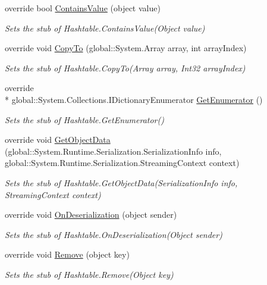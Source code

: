 \begin{DoxyCompactItemize}
override bool \hyperlink{class_system_1_1_configuration_1_1_fakes_1_1_stub_settings_context_a463a29ff1be652e69071918c94d49767}{Contains\-Value} (object value)
\begin{DoxyCompactList}\small\item\em Sets the stub of Hashtable.\-Contains\-Value(\-Object value)\end{DoxyCompactList}\item 
override void \hyperlink{class_system_1_1_configuration_1_1_fakes_1_1_stub_settings_context_a736d29f96651e18a1ee555c541705fd5}{Copy\-To} (global\-::\-System.\-Array array, int array\-Index)
\begin{DoxyCompactList}\small\item\em Sets the stub of Hashtable.\-Copy\-To(\-Array array, Int32 array\-Index)\end{DoxyCompactList}\item 
override \\*
global\-::\-System.\-Collections.\-I\-Dictionary\-Enumerator \hyperlink{class_system_1_1_configuration_1_1_fakes_1_1_stub_settings_context_adb930d19a7a9a9217bc70e73a2c2eebf}{Get\-Enumerator} ()
\begin{DoxyCompactList}\small\item\em Sets the stub of Hashtable.\-Get\-Enumerator()\end{DoxyCompactList}\item 
override void \hyperlink{class_system_1_1_configuration_1_1_fakes_1_1_stub_settings_context_a886af473a4dc56cf38fe19bb9a5b9ff6}{Get\-Object\-Data} (global\-::\-System.\-Runtime.\-Serialization.\-Serialization\-Info info, global\-::\-System.\-Runtime.\-Serialization.\-Streaming\-Context context)
\begin{DoxyCompactList}\small\item\em Sets the stub of Hashtable.\-Get\-Object\-Data(\-Serialization\-Info info, Streaming\-Context context)\end{DoxyCompactList}\item 
override void \hyperlink{class_system_1_1_configuration_1_1_fakes_1_1_stub_settings_context_a6ded15be5a59bd594b190c87bfe2f9a8}{On\-Deserialization} (object sender)
\begin{DoxyCompactList}\small\item\em Sets the stub of Hashtable.\-On\-Deserialization(\-Object sender)\end{DoxyCompactList}\item 
override void \hyperlink{class_system_1_1_configuration_1_1_fakes_1_1_stub_settings_context_a74c611d27056942de551c6a1800dc1e7}{Remove} (object key)
\begin{DoxyCompactList}\small\item\em Sets the stub of Hashtable.\-Remove(\-Object key)\end{DoxyCompactList}\end{DoxyCompactItemize}
